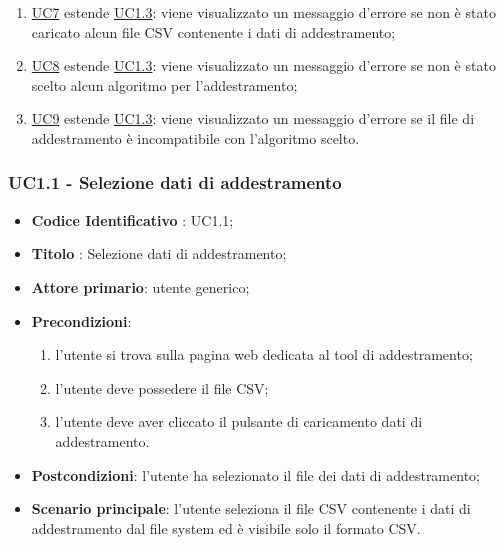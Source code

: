 \begin{itemize}
				\begin{enumerate}
					\item \hyperref[par:UC7]{UC7} estende \hyperref[par:UC1.3]{UC1.3}: viene visualizzato un messaggio d'errore se non è stato caricato alcun file CSV contenente i dati di addestramento;
					\item \hyperref[par:UC8]{UC8} estende \hyperref[par:UC1.3]{UC1.3}: viene visualizzato un messaggio d'errore se non è stato scelto alcun algoritmo per l'addestramento;
					\item \hyperref[par:UC9]{UC9} estende \hyperref[par:UC1.3]{UC1.3}: viene visualizzato un messaggio d'errore se il file di addestramento è incompatibile con l'algoritmo scelto.
				\end{enumerate}
			
		\end{itemize}
		
		\label{par:UC1.1}
		\subsubsection{UC1.1 - Selezione dati di addestramento }
		\begin{itemize}
			\item\textbf{Codice Identificativo} : UC1.1;
			\item\textbf{Titolo} : Selezione dati di addestramento;
			\item\textbf{Attore primario}: utente generico;
			\item\textbf{Precondizioni}:
				\begin{enumerate}
					\item l'utente si trova sulla pagina web dedicata al tool di addestramento;
					\item l'utente deve possedere il file CSV;
					\item l'utente deve aver cliccato il pulsante di caricamento dati di addestramento.
				\end{enumerate}
			\item\textbf{Postcondizioni}: l'utente ha selezionato il file dei dati di addestramento;
			\item\textbf{Scenario principale}: l'utente seleziona il file CSV contenente i dati di addestramento dal file system ed è visibile solo il formato CSV.
		\end{itemize}
		
		\label{par:UC1.2}
